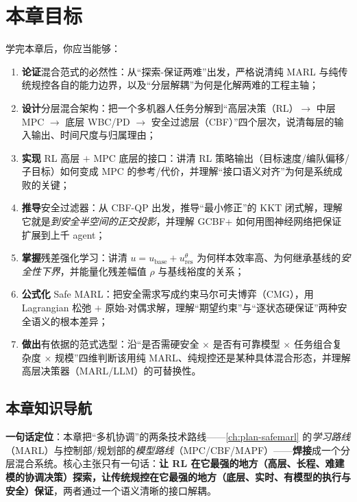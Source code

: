 \section*{本章目标}
学完本章后，你应当能够：
\begin{enumerate}
  \item \textbf{论证}混合范式的必然性：从“探索-保证两难”出发，严格说清纯 MARL 与纯传统规控各自的能力边界，以及“分层解耦”为何是化解两难的工程主轴；
  \item \textbf{设计}分层混合架构：把一个多机器人任务分解到“高层决策（RL）$\to$ 中层 MPC $\to$ 底层 WBC/PD $\to$ 安全过滤层（CBF）”四个层次，说清每层的输入输出、时间尺度与归属理由；
  \item \textbf{实现} RL 高层 $+$ MPC 底层的接口：讲清 RL 策略输出（目标速度/编队偏移/子目标）如何变成 MPC 的参考/代价，并理解“接口语义对齐”为何是系统成败的关键；
  \item \textbf{推导}安全过滤器：从 CBF-QP 出发，推导“最小修正”的 KKT 闭式解，理解它就是\emph{到安全半空间的正交投影}，并理解 GCBF+ 如何用图神经网络把保证扩展到上千 agent；
  \item \textbf{掌握}残差强化学习：讲清 $u=u_{\text{base}}+u_{\text{res}}^{\theta}$ 为何样本效率高、为何继承基线的\emph{安全性下界}，并能量化残差幅值 $\rho$ 与基线裕度的关系；
  \item \textbf{公式化} Safe MARL：把安全需求写成约束马尔可夫博弈（CMG），用 Lagrangian 松弛 $+$ 原始-对偶求解，理解“期望约束”与“逐状态硬保证”两种安全语义的根本差异；
  \item \textbf{做出}有依据的范式选型：沿“是否需硬安全 $\times$ 是否有可靠模型 $\times$ 任务组合复杂度 $\times$ 规模”四维判断该用纯 MARL、纯规控还是某种具体混合形态，并理解高层决策器（MARL/LLM）的可替换性。
\end{enumerate}

\subsection*{本章知识导航}
\textbf{一句话定位}：本章把“多机协调”的两条技术路线——\cref{ch:plan-safemarl} 的\emph{学习路线}（MARL）与控制部/规划部的\emph{模型路线}（MPC/CBF/MAPF）——\textbf{焊接}成一个分层混合系统。核心主张只有一句话：\textbf{让 RL 在它最强的地方（高层、长程、难建模的协调决策）探索，让传统规控在它最强的地方（底层、实时、有模型的执行与安全）保证}，两者通过一个语义清晰的接口解耦。

